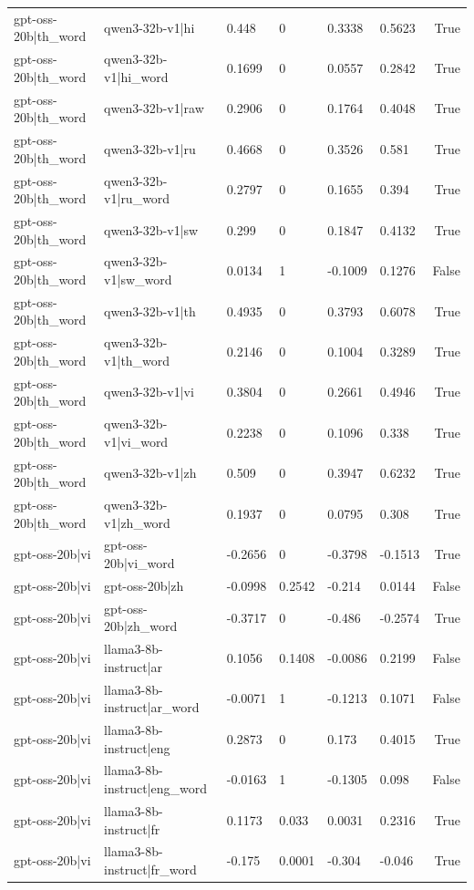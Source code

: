 \begin{table}
\begin{tabular}{llllllr}
gpt-oss-20b|th_word & qwen3-32b-v1|hi & 0.448 & 0 & 0.3338 & 0.5623 & True \\
gpt-oss-20b|th_word & qwen3-32b-v1|hi_word & 0.1699 & 0 & 0.0557 & 0.2842 & True \\
gpt-oss-20b|th_word & qwen3-32b-v1|raw & 0.2906 & 0 & 0.1764 & 0.4048 & True \\
gpt-oss-20b|th_word & qwen3-32b-v1|ru & 0.4668 & 0 & 0.3526 & 0.581 & True \\
gpt-oss-20b|th_word & qwen3-32b-v1|ru_word & 0.2797 & 0 & 0.1655 & 0.394 & True \\
gpt-oss-20b|th_word & qwen3-32b-v1|sw & 0.299 & 0 & 0.1847 & 0.4132 & True \\
gpt-oss-20b|th_word & qwen3-32b-v1|sw_word & 0.0134 & 1 & -0.1009 & 0.1276 & False \\
gpt-oss-20b|th_word & qwen3-32b-v1|th & 0.4935 & 0 & 0.3793 & 0.6078 & True \\
gpt-oss-20b|th_word & qwen3-32b-v1|th_word & 0.2146 & 0 & 0.1004 & 0.3289 & True \\
gpt-oss-20b|th_word & qwen3-32b-v1|vi & 0.3804 & 0 & 0.2661 & 0.4946 & True \\
gpt-oss-20b|th_word & qwen3-32b-v1|vi_word & 0.2238 & 0 & 0.1096 & 0.338 & True \\
gpt-oss-20b|th_word & qwen3-32b-v1|zh & 0.509 & 0 & 0.3947 & 0.6232 & True \\
gpt-oss-20b|th_word & qwen3-32b-v1|zh_word & 0.1937 & 0 & 0.0795 & 0.308 & True \\
gpt-oss-20b|vi & gpt-oss-20b|vi_word & -0.2656 & 0 & -0.3798 & -0.1513 & True \\
gpt-oss-20b|vi & gpt-oss-20b|zh & -0.0998 & 0.2542 & -0.214 & 0.0144 & False \\
gpt-oss-20b|vi & gpt-oss-20b|zh_word & -0.3717 & 0 & -0.486 & -0.2574 & True \\
gpt-oss-20b|vi & llama3-8b-instruct|ar & 0.1056 & 0.1408 & -0.0086 & 0.2199 & False \\
gpt-oss-20b|vi & llama3-8b-instruct|ar_word & -0.0071 & 1 & -0.1213 & 0.1071 & False \\
gpt-oss-20b|vi & llama3-8b-instruct|eng & 0.2873 & 0 & 0.173 & 0.4015 & True \\
gpt-oss-20b|vi & llama3-8b-instruct|eng_word & -0.0163 & 1 & -0.1305 & 0.098 & False \\
gpt-oss-20b|vi & llama3-8b-instruct|fr & 0.1173 & 0.033 & 0.0031 & 0.2316 & True \\
gpt-oss-20b|vi & llama3-8b-instruct|fr_word & -0.175 & 0.0001 & -0.304 & -0.046 & True \\

\end{tabular}
\end{table}
